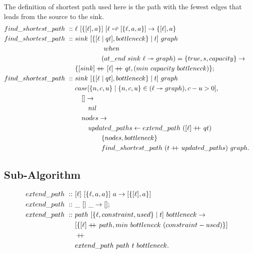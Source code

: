 \documentclass[a4paper,10pt]{book}
\newcommand\when{\  when\ }
\newcommand\doubleplus{+\kern-1.3ex+\kern0.8ex}
\begin{document}
The definition of shortest path used here is the path with the fewest edges that leads from the source to the sink.
\begin{align*}
find\_shortest\_path\ ::\ &\ell\ [\{[\ell],a\}]\ [\ell\looparrowleft [\{\ell,a,a\}]\rightarrow \{[\ell],a\}\\
find\_shortest\_path\ ::\ &sink\ [\{[\ell\mid qt],bottleneck\}\mid t]\ graph\\
	&\qquad\qquad\when\\
	&\qquad\qquad(at\_end\ sink\ \ell\twoheadrightarrow graph) = \{true,s,capacity\}\rightarrow\\
	&\{[sink]\doubleplus[\ell]\doubleplus qt,(min\ capacity\ bottleneck)\};\\
find\_shortest\_path\ ::\ &sink\ [\{[\ell\mid qt],bottleneck\}\mid t]\ graph\\
	&case [\{n,c,u\}\mid \{n,c,u\}\in (\ell\twoheadrightarrow graph),c-u>0],\\
	&\quad[]\rightarrow\\
	&\qquad nil\\
	&\quad nodes\rightarrow\\
	&\qquad updated\_paths\leftarrow extend\_path\ ([\ell]\doubleplus qt)\\
	&\qquad\qquad\{nodes,bottleneck\}\\
	&\qquad\qquad find\_shortest\_path\ (t\doubleplus updated\_paths)\ graph.
\end{align*}
\subsection{Sub-Algorithm}
\begin{align*}
extend\_path\ ::\ &[\ell]\ [\{\ell,a,a\}]\ a\rightarrow [\{[\ell],a\}]\\
extend\_path\ ::\ &\_\ []\ \_\rightarrow [];\\
extend\_path\ ::\ &path\ [\{\ell,constraint,used\}\mid t]\ bottleneck\rightarrow\\
	&[\{[\ell]\doubleplus path,min\ bottleneck\ (constraint-used)\}]\\
	&\doubleplus\\
	&extend\_path\ path\ t\ bottleneck.
\end{align*}
\end{document}
